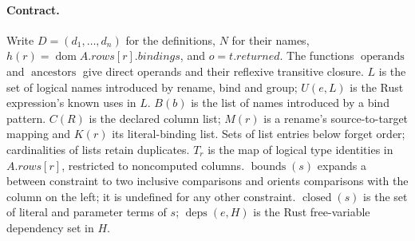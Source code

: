 \paragraph{Contract.}
Write $D=(d_1,\ldots,d_n)$ for the definitions, $N$ for their names,
$h(r)=\operatorname{dom}A.rows[r].bindings$, and $o=t.returned$.
The functions $\operatorname{operands}$ and $\operatorname{ancestors}$ give
direct operands and their reflexive transitive closure.
$L$ is the set of logical names introduced by rename, bind and group;
$U(e,L)$ is the Rust expression's known uses in $L$.
$B(b)$ is the list of names introduced by a bind pattern.
$C(R)$ is the declared column list; $M(r)$ is a rename's source-to-target
mapping and $K(r)$ its literal-binding list. Sets of list entries below
forget order; cardinalities of lists retain duplicates.
$T_r$ is the map of logical type identities in $A.rows[r]$, restricted to
noncomputed columns. $\operatorname{bounds}(s)$ expands a between constraint
to two inclusive comparisons and orients comparisons with the column on
the left; it is undefined for any other constraint.
$\operatorname{closed}(s)$ is the set of literal and parameter terms of $s$;
$\operatorname{deps}(e,H)$ is the Rust free-variable dependency set in $H$.
